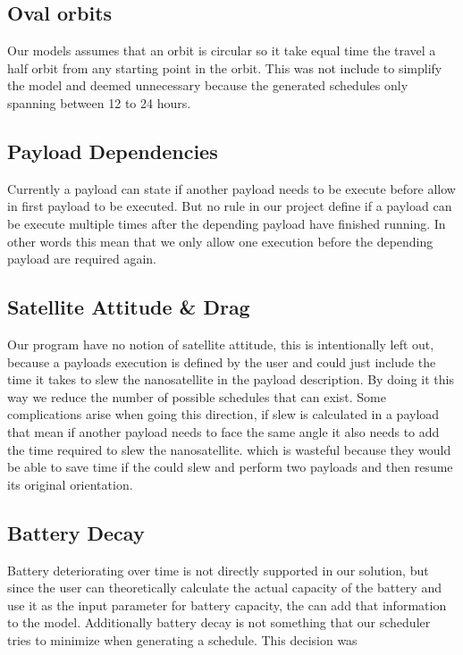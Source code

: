 \subsection*{Oval orbits}
Our models assumes that an orbit is circular so it take equal time the travel a half orbit from any starting point in the orbit. This was not include to simplify the model and deemed unnecessary because the generated schedules only spanning between 12 to 24 hours. 

\subsection*{Payload Dependencies}
Currently a payload can state if another payload needs to be execute before allow in first payload to be executed. But no rule in our project define if a payload can be execute multiple times after the depending payload have finished running. In other words this mean that we only allow one execution before the depending payload are required again.

\subsection*{Satellite Attitude \& Drag}
Our program have no notion of satellite attitude, this is intentionally left out, because a payloads execution is defined by the user and could just include the time it takes to slew the nanosatellite in the payload description. By doing it this way we reduce the number of possible schedules that can exist. Some complications arise when going this direction, if slew is calculated in a payload that mean if another payload needs to face the same angle it also needs to add the time required to slew the nanosatellite. which is wasteful because they would be able to save time if the could slew and perform two payloads and then resume its original orientation.

\subsection*{Battery Decay}
Battery deteriorating over time is not directly supported in our solution, but since the user can theoretically calculate the actual capacity of the battery and use it as the input parameter for battery capacity, the can add that information to the model. Additionally battery decay is not something that our scheduler tries to minimize when generating a schedule. This decision was

